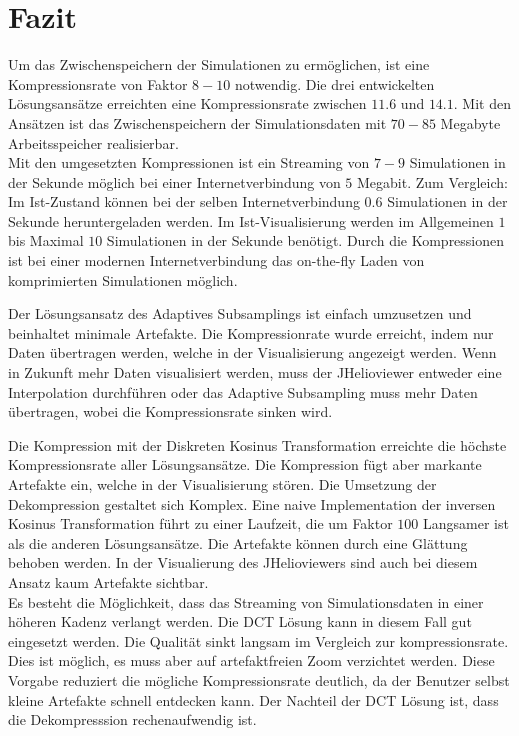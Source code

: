 \section{Fazit}
Um das Zwischenspeichern der Simulationen zu ermöglichen, ist eine Kompressionsrate von Faktor $8-10$ notwendig. Die drei entwickelten Lösungsansätze  erreichten eine Kompressionsrate zwischen $11.6$ und $14.1$. Mit den Ansätzen ist das Zwischenspeichern der Simulationsdaten mit $70-85$ Megabyte Arbeitsspeicher realisierbar.\\
Mit den umgesetzten Kompressionen ist ein Streaming von $7-9$ Simulationen in der Sekunde möglich bei einer Internetverbindung von $5$ Megabit. Zum Vergleich: Im Ist-Zustand können bei der selben Internetverbindung $0.6$ Simulationen in der Sekunde heruntergeladen werden. Im Ist-Visualisierung werden im Allgemeinen $1$ bis Maximal $10$ Simulationen in der Sekunde benötigt. Durch die Kompressionen ist bei einer modernen Internetverbindung das on-the-fly Laden von komprimierten Simulationen möglich.
 
Der Lösungsansatz des Adaptives Subsamplings ist einfach umzusetzen und beinhaltet minimale Artefakte. Die Kompressionrate wurde erreicht, indem nur Daten übertragen werden, welche in der Visualisierung angezeigt werden. Wenn in Zukunft mehr Daten visualisiert werden, muss der JHelioviewer entweder eine Interpolation durchführen oder das Adaptive Subsampling muss mehr Daten übertragen, wobei die Kompressionsrate sinken wird.

Die Kompression mit der Diskreten Kosinus Transformation erreichte die höchste Kompressionsrate aller Lösungsansätze. Die Kompression fügt aber markante Artefakte ein, welche in der Visualisierung stören. Die Umsetzung der Dekompression gestaltet sich Komplex. Eine naive Implementation der inversen Kosinus Transformation führt zu einer Laufzeit, die um Faktor $100$ Langsamer ist als die anderen Lösungsansätze.
Die Artefakte können durch eine Glättung behoben werden. In der Visualierung des JHelioviewers sind auch bei diesem Ansatz kaum Artefakte sichtbar.\\
Es besteht die Möglichkeit, dass das Streaming von Simulationsdaten in einer höheren Kadenz verlangt werden. Die DCT Lösung kann in diesem Fall gut eingesetzt werden. Die Qualität sinkt langsam im Vergleich zur kompressionsrate. Dies ist möglich, es muss aber auf artefaktfreien Zoom verzichtet werden. Diese Vorgabe reduziert die mögliche Kompressionsrate deutlich, da der Benutzer selbst kleine Artefakte schnell entdecken kann.  Der Nachteil der DCT Lösung ist, dass die Dekompresssion rechenaufwendig ist.

